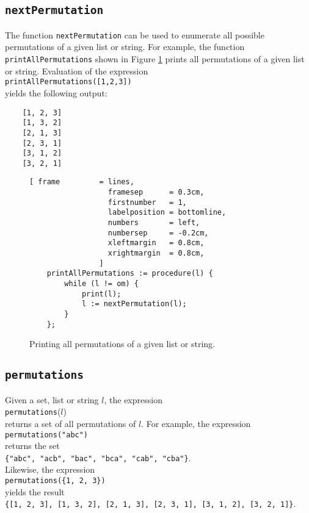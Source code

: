 \subsection{\texttt{nextPermutation}}
The function \texttt{nextPermutation} can be used to enumerate all possible permutations
of a given list or string.  For example, the function \texttt{printAllPermutations} shown
in Figure \ref{fig:allPermutations.stlx} prints all permutations of a given list or string.
Evaluation of the expression
\\[0.2cm]
\hspace*{1.3cm}
\texttt{printAllPermutations([1,2,3])}
\\[0.2cm]
yields the following output:
\begin{verbatim}
    [1, 2, 3]
    [1, 3, 2]
    [2, 1, 3]
    [2, 3, 1]
    [3, 1, 2]
    [3, 2, 1]
\end{verbatim}

\begin{figure}[!ht]
\centering
\begin{Verbatim}[ frame         = lines, 
                  framesep      = 0.3cm, 
                  firstnumber   = 1,
                  labelposition = bottomline,
                  numbers       = left,
                  numbersep     = -0.2cm,
                  xleftmargin   = 0.8cm,
                  xrightmargin  = 0.8cm,
                ]
    printAllPermutations := procedure(l) {
        while (l != om) {
            print(l);
            l := nextPermutation(l);        
        }
    };
\end{Verbatim}
\vspace*{-0.3cm}
\caption{Printing all permutations of a given list or string.}
\label{fig:allPermutations.stlx}
\end{figure}

\subsection{\texttt{permutations}}
Given a set, list or string $l$, the expression
\\[0.2cm]
\hspace*{1.3cm}
\texttt{permutations}($l$)
\\[0.2cm]
returns a set of all permutations of $l$.  For example, the expression
\\[0.2cm]
\hspace*{1.3cm}
\texttt{permutations("abc")}
\\[0.2cm]
returns the set
\\[0.2cm]
\hspace*{1.3cm}
\texttt{\{"abc", "acb", "bac", "bca", "cab", "cba"\}}.
\\[0.2cm]
Likewise, the expression
\\[0.2cm]
\hspace*{1.3cm}
\texttt{permutations(\{1, 2, 3\})}
\\[0.2cm]
yields the result
\\[0.2cm]
\hspace*{1.3cm}
\texttt{\{[1, 2, 3], [1, 3, 2], [2, 1, 3], [2, 3, 1], [3, 1, 2], [3, 2, 1]\}}.

